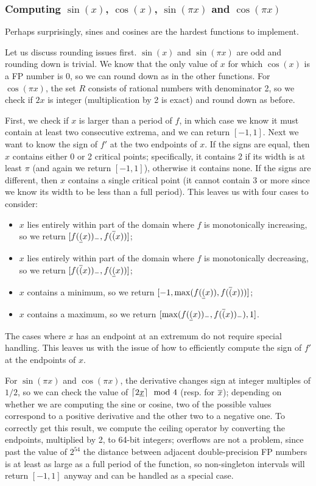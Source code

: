 \subsubsection{Computing $\sin(x)$, $\cos(x)$, $\sin(\pi x)$ and $\cos(\pi x)$}
Perhaps surprisingly, sines and cosines are the hardest functions to implement.

Let us discuss rounding issues first. $\sin(x)$ and $\sin(\pi x)$ are odd and rounding down is trivial.
We know that the only value of $x$ for which $\cos(x)$ is a FP number is $0$, so we can round down as in the other functions. For $\cos(\pi x)$, the set $R$ consists of rational numbers with denominator 2, so we check if $2x$ is integer (multiplication by 2 is exact) and round down as before.

First, we check if $x$ is larger than a period of $f$, in which case we know it must contain at least two consecutive extrema, and we can return $[-1,1]$.
Next we want to know the sign of $f'$ at the two endpoints of $x$.
If the signs are equal, then $x$ contains either 0 or 2 critical points; specifically, it contains 2 if its width is at least $\pi$ (and again we return $[-1,1]$), otherwise it contains none.
If the signs are different, then $x$ contains a single critical point (it cannot contain 3 or more since we know its width to be less than a full period).
This leaves us with four cases to consider:
\begin{itemize}
	\item $x$ lies entirely within part of the domain where $f$ is monotonically increasing, so we return $[f(\underline{(}x))_-, f(\overline{(}x))]$;
	\item $x$ lies entirely within part of the domain where $f$ is monotonically decreasing, so we return $[f(\overline{(}x))_-, f(\underline{(}x))]$;
	\item $x$ contains a minimum, so we return $[-1, \max(f(\underline{(}x)), f(\overline{(}x)))]$;
	\item $x$ contains a maximum, so we return $[\max(f(\underline{(}x))_-, f(\overline{(}x))_-), 1]$.
\end{itemize}
The cases where $x$ has an endpoint at an extremum do not require special handling.
This leaves us with the issue of how to efficiently compute the sign of $f'$ at the endpoints of $x$.

For $\sin(\pi x)$ and $\cos(\pi x)$, the derivative changes sign at integer multiples of $1/2$, so we can check the value of $\lceil2\underline{x}\rceil\mod 4$ (resp. for $\overline{x}$); depending on whether we are computing the sine or cosine, two of the possible values correspond to a positive derivative and the other two to a negative one.
To correctly get this result, we compute the ceiling operator by converting the endpoints, multiplied by 2, to 64-bit integers; overflows are not a problem, since past the value of $2^{54}$ the distance between adjacent double-precision FP numbers is at least as large as a full period of the function, so non-singleton intervals will return $[-1,1]$ anyway and can be handled as a special case.

